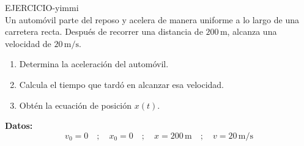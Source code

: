 

  
 \begin{multicols}{2}
    \begin{excercise}[][][]{}{
            EJERCICIO-yimmi\\
            Un automóvil parte del reposo y acelera de manera uniforme a lo largo de una carretera recta.  
            Después de recorrer una distancia de $200 \, \text{m}$, alcanza una velocidad de $20 \, \text{m/s}$.
            \begin{enumerate}
                \item Determina la aceleración del automóvil.
                \item Calcula el tiempo que tardó en alcanzar esa velocidad.
                \item Obtén la ecuación de posición $x(t)$.
            \end{enumerate}
            \noindent\textbf{Datos:}
            \[
            v_0 = 0 \quad ; \quad x_0 = 0 \quad ; \quad x = 200 \, \text{m} \quad ; \quad v = 20 \, \text{m/s}
            \]
        }
    \end{excercise}
 \end{multicols}
